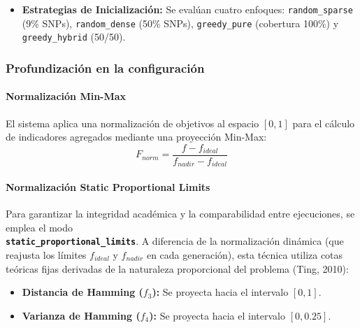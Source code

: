\documentclass[a4paper,10pt]{article}
\begin{document}
\begin{itemize}
\begin{itemize}
\begin{itemize}
        \end{itemize}
        \item \textbf{Otros Algoritmos:} NSGA-II y SPEA2 basados en dominancia; MOEA/D con vecindario de 15 y penalización PBI de 5.0.
    \end{itemize}
    \item \textbf{Estrategias de Inicialización:} Se evalúan cuatro enfoques: \texttt{random\_sparse} (9\% SNPs), \texttt{random\_dense} (50\% SNPs), \texttt{greedy\_pure} (cobertura 100\%) y \texttt{greedy\_hybrid} (50/50).
\end{itemize}

\subsubsection{Profundización en la configuración}

\paragraph{Normalización Min-Max}
El sistema aplica una normalización de objetivos al espacio $[0, 1]$ para el cálculo de indicadores agregados mediante una proyección Min-Max:
\begin{equation}
\label{eq:norm_common}
F_{norm} = \frac{f - f_{ideal}}{f_{nadir} - f_{ideal}}
\end{equation}

\paragraph{Normalización Static Proportional Limits}
Para garantizar la integridad académica y la comparabilidad entre ejecuciones, se emplea el modo \\ \mbox{\textbf{\texttt{static\_proportional\_limits}}}. A diferencia de la normalización dinámica (que reajusta los límites $f_{ideal}$ y $f_{nadir}$ en cada generación), esta técnica utiliza cotas teóricas fijas derivadas de la naturaleza proporcional del problema (Ting, 2010):

\begin{itemize}
    \item \textbf{Distancia de Hamming ($f_3$):} Se proyecta hacia el intervalo $[0, 1]$.
    \item \textbf{Varianza de Hamming ($f_4$):} Se proyecta hacia el intervalo $[0, \mbox{0.25}]$.
\end{itemize}
\end{document}

